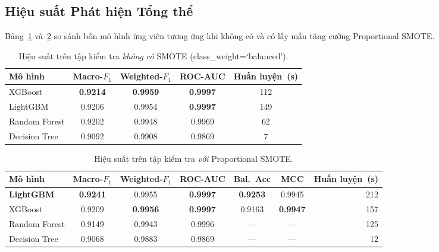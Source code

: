 \subsection{Hiệu suất Phát hiện Tổng thể}
\label{sec:exp-overall}

Bảng~\ref{tab:results-no-smote} và~\ref{tab:results-smote} so sánh bốn mô hình ứng viên tương ứng khi không có và có lấy mẫu tăng cường Proportional SMOTE.

\begin{table}[h]
\centering
\caption{Hiệu suất trên tập kiểm tra \emph{không có} SMOTE (class\_weight=`balanced').}
\label{tab:results-no-smote}
\begin{tabular}{lcccc}
\toprule
\textbf{Mô hình} & \textbf{Macro-$F_1$} & \textbf{Weighted-$F_1$} & \textbf{ROC-AUC} & \textbf{Huấn luyện~(s)}  \\
\midrule
XGBoost       & \textbf{0.9214} & \textbf{0.9959} & \textbf{0.9997} & 112  \\
LightGBM      & 0.9206          & 0.9954          & \textbf{0.9997} & 149  \\
Random Forest & 0.9202          & 0.9948          & 0.9969          &  62  \\
Decision Tree & 0.9092          & 0.9908          & 0.9869          &   7  \\
\bottomrule
\end{tabular}
\end{table}

\begin{table}[h]
\centering
\caption{Hiệu suất trên tập kiểm tra \emph{với} Proportional SMOTE.}
\label{tab:results-smote}
\begin{tabular}{lcccccr}
\toprule
\textbf{Mô hình} & \textbf{Macro-$F_1$} & \textbf{Weighted-$F_1$} & \textbf{ROC-AUC} & \textbf{Bal.\ Acc} & \textbf{MCC} & \textbf{Huấn luyện~(s)}  \\
\midrule
\textbf{LightGBM} & \textbf{0.9241} & 0.9955 & \textbf{0.9997} & \textbf{0.9253} & 0.9945 & 212  \\
XGBoost           & 0.9209          & \textbf{0.9956} & \textbf{0.9997} & 0.9163 & \textbf{0.9947} & 157  \\
Random Forest     & 0.9149          & 0.9943          & 0.9996          & ---    & ---    & 125  \\
Decision Tree     & 0.9068          & 0.9883          & 0.9869          & ---    & ---    &  12  \\
\bottomrule
\end{tabular}
\end{table}

